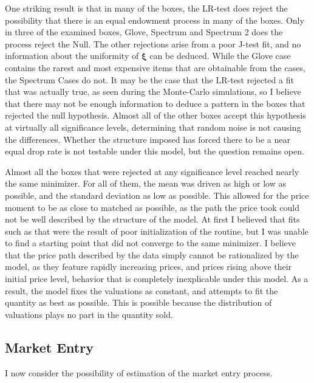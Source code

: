 \documentclass[12pt, letterpaper]{paper}
\begin{document}
One striking result is that in many of the boxes, the LR-test does
reject the possibility that there is an equal endowment process in
many of the boxes. Only in three of the examined boxes, Glove,
Spectrum and Spectrum 2 does the process reject the Null. The other
rejections arise from a poor J-test fit, and no information about the
uniformity of $\bm{\xi}$ can be deduced. While the Glove case contains the
rarest and most expensive items that are obtainable from the cases,
the Spectrum Cases do not. It may be the case that the LR-test
rejected a fit that was actually true, as seen during the Monte-Carlo
simulations, so I believe that there may not be enough information to
deduce a pattern in the boxes that rejected the null
hypothesis. Almost all of the other boxes accept this hypothesis at
virtually all significance levels, determining that random noise is not
causing the differences. Whether the structure imposed has forced
there to be a near equal drop rate is not testable under this model,
but the question remains open.

Almost all the boxes that were rejected at any significance level
reached nearly the same minimizer. For all of them, the mean was
driven as high or low as possible, and the standard deviation as low as
possible. This allowed for the price moment to be as close to matched
as possible, as the path the price took could not be well described by
the structure of the model. At first I believed that fits such as that
were the result of poor initialization of the routine, but I was
unable to find a starting point that did not converge to the same
minimizer. I believe that the price path described by the data simply
cannot be rationalized by the model, as they feature rapidly
increasing prices, and prices rising above their initial price level,
behavior that is completely inexplicable under this model. As a result,
the model fixes the valuations as constant, and attempts to fit the
quantity as best as possible. This is possible because the
distribution of valuations plays no part in the quantity sold.


\subsection{Market Entry}
\label{sec-4-5}
I now consider the possibility of estimation of the market entry process.
\end{document}
